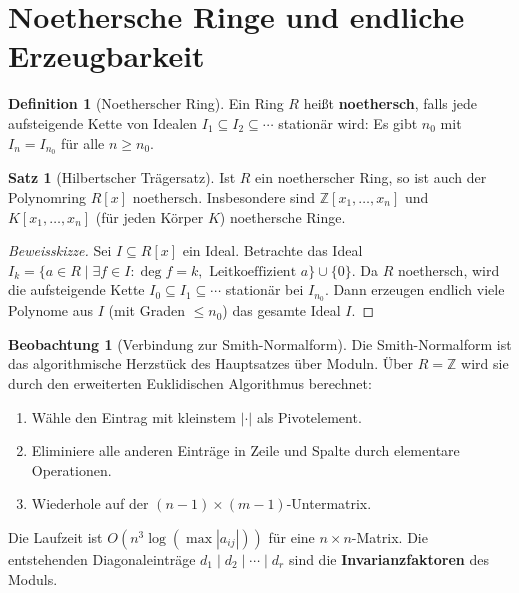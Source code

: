 ﻿\documentclass[a4paper,12pt]{report}
\theoremstyle{definition}
\newtheorem{definition}{Definition}
\newtheorem{satz}{Satz}
\newtheorem{beobachtung}{Beobachtung}
\begin{document}
\section{Noethersche Ringe und endliche Erzeugbarkeit}

\begin{definition}[Noetherscher Ring]
    Ein Ring $R$ heißt \textbf{noethersch}, falls jede aufsteigende
    Kette von Idealen $I_1 \subseteq I_2 \subseteq \cdots$ stationär
    wird: Es gibt $n_0$ mit $I_n = I_{n_0}$ für alle $n \geq n_0$.
\end{definition}

\begin{satz}[Hilbertscher Trägersatz]
    Ist $R$ ein noetherscher Ring, so ist auch der Polynomring $R[x]$
    noethersch. Insbesondere sind $\mathbb{Z}[x_1, \ldots, x_n]$ und
    $K[x_1, \ldots, x_n]$ (für jeden Körper $K$) noethersche Ringe.
\end{satz}
\begin{proof}[Beweisskizze]
    Sei $I \subseteq R[x]$ ein Ideal. Betrachte das Ideal
    $I_k = \{a \in R \mid \exists f \in I : \deg f = k, \text{ Leitkoeffizient } a\}
    \cup \{0\}$. Da $R$ noethersch, wird die aufsteigende Kette
    $I_0 \subseteq I_1 \subseteq \cdots$ stationär bei $I_{n_0}$.
    Dann erzeugen endlich viele Polynome aus $I$ (mit Graden $\leq n_0$)
    das gesamte Ideal $I$.
\end{proof}

\begin{beobachtung}[Verbindung zur Smith-Normalform]
    Die Smith-Normalform ist das algorithmische Herzstück des Hauptsatzes
    über Moduln. Über $R = \mathbb{Z}$ wird sie durch den
    erweiterten Euklidischen Algorithmus berechnet:
    \begin{enumerate}
        \item Wähle den Eintrag mit kleinstem $|\cdot|$ als Pivotelement.
        \item Eliminiere alle anderen Einträge in Zeile und Spalte
              durch elementare Operationen.
        \item Wiederhole auf der $(n-1)\times(m-1)$-Untermatrix.
    \end{enumerate}
    Die Laufzeit ist $O(n^3 \log(\max|a_{ij}|))$ für eine $n \times n$-Matrix.
    Die entstehenden Diagonaleinträge $d_1 \mid d_2 \mid \cdots \mid d_r$
    sind die \textbf{Invarianzfaktoren} des Moduls.
\end{beobachtung}
\end{document}
